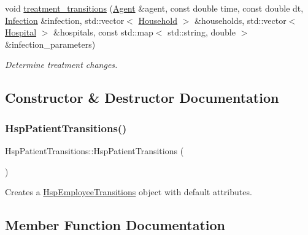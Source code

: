 \begin{DoxyCompactItemize}
void \hyperlink{classHspPatientTransitions_a1ba8588444d499d5aed74a12bdc07d21}{treatment\+\_\+transitions} (\hyperlink{classAgent}{Agent} \&agent, const double time, const double dt, \hyperlink{classInfection}{Infection} \&infection, std\+::vector$<$ \hyperlink{classHousehold}{Household} $>$ \&households, std\+::vector$<$ \hyperlink{classHospital}{Hospital} $>$ \&hospitals, const std\+::map$<$ std\+::string, double $>$ \&infection\+\_\+parameters)
\begin{DoxyCompactList}\small\item\em Determine treatment changes. \end{DoxyCompactList}\end{DoxyCompactItemize}


\subsection{Constructor \& Destructor Documentation}
\mbox{\label{classHspPatientTransitions_ac340b64447c30fd3e22f17a0f3009f0f}} 
\subsubsection{\texorpdfstring{Hsp\+Patient\+Transitions()}{HspPatientTransitions()}}
{\footnotesize\ttfamily Hsp\+Patient\+Transitions\+::\+Hsp\+Patient\+Transitions (\begin{DoxyParamCaption}{ }\end{DoxyParamCaption})\hspace{0.3cm}{\ttfamily [default]}}



Creates a \hyperlink{classHspEmployeeTransitions}{Hsp\+Employee\+Transitions} object with default attributes. 



\subsection{Member Function Documentation}
\mbox{\label{classHspPatientTransitions_a997c4ba7748a8cb62efd0a5ab6c3da9f}} 
